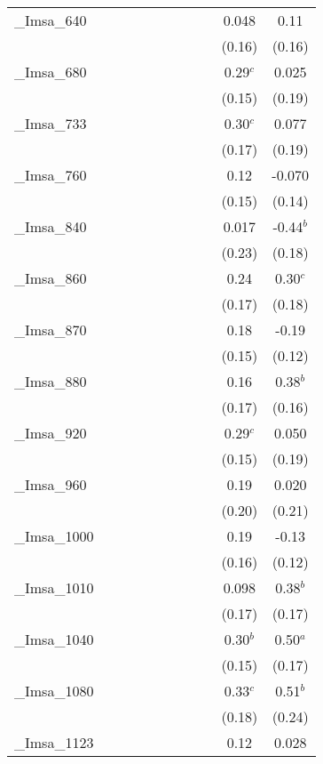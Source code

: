 \documentclass[]{article}
\begin{document}
\begin{tabular}{lcccccccccc}
\_Imsa\_640 &  &  &  &  &  &  &  &  & 0.048 & 0.11 \\
 &  &  &  &  &  &  &  &  & (0.16) & (0.16) \\
\_Imsa\_680 &  &  &  &  &  &  &  &  & 0.29$^c$ & 0.025 \\
 &  &  &  &  &  &  &  &  & (0.15) & (0.19) \\
\_Imsa\_733 &  &  &  &  &  &  &  &  & 0.30$^c$ & 0.077 \\
 &  &  &  &  &  &  &  &  & (0.17) & (0.19) \\
\_Imsa\_760 &  &  &  &  &  &  &  &  & 0.12 & -0.070 \\
 &  &  &  &  &  &  &  &  & (0.15) & (0.14) \\
\_Imsa\_840 &  &  &  &  &  &  &  &  & 0.017 & -0.44$^b$ \\
 &  &  &  &  &  &  &  &  & (0.23) & (0.18) \\
\_Imsa\_860 &  &  &  &  &  &  &  &  & 0.24 & 0.30$^c$ \\
 &  &  &  &  &  &  &  &  & (0.17) & (0.18) \\
\_Imsa\_870 &  &  &  &  &  &  &  &  & 0.18 & -0.19 \\
 &  &  &  &  &  &  &  &  & (0.15) & (0.12) \\
\_Imsa\_880 &  &  &  &  &  &  &  &  & 0.16 & 0.38$^b$ \\
 &  &  &  &  &  &  &  &  & (0.17) & (0.16) \\
\_Imsa\_920 &  &  &  &  &  &  &  &  & 0.29$^c$ & 0.050 \\
 &  &  &  &  &  &  &  &  & (0.15) & (0.19) \\
\_Imsa\_960 &  &  &  &  &  &  &  &  & 0.19 & 0.020 \\
 &  &  &  &  &  &  &  &  & (0.20) & (0.21) \\
\_Imsa\_1000 &  &  &  &  &  &  &  &  & 0.19 & -0.13 \\
 &  &  &  &  &  &  &  &  & (0.16) & (0.12) \\
\_Imsa\_1010 &  &  &  &  &  &  &  &  & 0.098 & 0.38$^b$ \\
 &  &  &  &  &  &  &  &  & (0.17) & (0.17) \\
\_Imsa\_1040 &  &  &  &  &  &  &  &  & 0.30$^b$ & 0.50$^a$ \\
 &  &  &  &  &  &  &  &  & (0.15) & (0.17) \\
\_Imsa\_1080 &  &  &  &  &  &  &  &  & 0.33$^c$ & 0.51$^b$ \\
 &  &  &  &  &  &  &  &  & (0.18) & (0.24) \\
\_Imsa\_1123 &  &  &  &  &  &  &  &  & 0.12 & 0.028 \\

\end{tabular}
\end{document}
